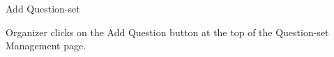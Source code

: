 
\begin{uc}{Add Question-set}

    
    \begin{uc-trig}
        Organizer clicks on the Add Question button at the top of the Question-set
        Management page.
    \end{uc-trig}
\end{uc}


